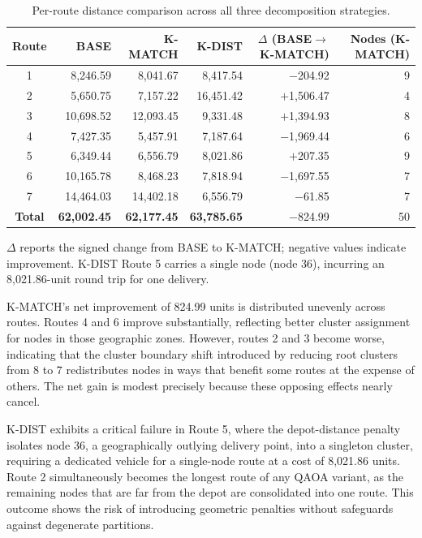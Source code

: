 \documentclass[a4paper]{report}
\begin{document}
{\begin{itemize}
\begin{itemize}
\begin{table}[h]
\centering
\begin{tabular}{crrrrr}
\hline
\textbf{Route} & \textbf{BASE} & \textbf{K-MATCH} & \textbf{K-DIST} 
& \textbf{$\Delta$ (BASE$\to$K-MATCH)} & \textbf{Nodes (K-MATCH)} \\
\hline
1 & 8,246.59  & 8,041.67  & 8,417.54  & $-$204.92   & 9  \\
2 & 5,650.75  & 7,157.22  & 16,451.42 & $+$1,506.47 & 4  \\
3 & 10,698.52 & 12,093.45 & 9,331.48  & $+$1,394.93 & 8  \\
4 & 7,427.35  & 5,457.91  & 7,187.64  & $-$1,969.44 & 6  \\
5 & 6,349.44  & 6,556.79  & 8,021.86  & $+$207.35   & 9  \\
6 & 10,165.78 & 8,468.23  & 7,818.94  & $-$1,697.55 & 7  \\
7 & 14,464.03 & 14,402.18 & 6,556.79  & $-$61.85    & 7  \\
\hline
\textbf{Total} & \textbf{62,002.45} & \textbf{62,177.45} 
               & \textbf{63,785.65} & $-$824.99 & 50 \\
\hline
\end{tabular}
\caption{Per-route distance comparison across all three decomposition strategies. }
\label{tab:exp3-perroute}
\end{table}

$\Delta$ reports the signed change from BASE to K-MATCH; negative values indicate 
improvement. K-DIST Route 5 carries a single node (node 36), incurring an 
8,021.86-unit round trip for one delivery.

K-MATCH's net improvement of 824.99 units is distributed unevenly across routes. Routes 4 and 6 improve substantially, reflecting better cluster assignment for nodes in those geographic zones. However, routes 2 and 3 become worse, indicating that the cluster boundary shift introduced by reducing root clusters from 8 to 7 redistributes nodes in ways that benefit some routes at the expense of others. 
The net gain is modest precisely because these opposing effects nearly cancel.

K-DIST exhibits a critical failure in Route 5, where the depot-distance penalty isolates node 36, a geographically outlying delivery point, into a singleton cluster, requiring a dedicated vehicle for a single-node route at a cost of 8,021.86 units. Route 2 simultaneously becomes the longest route of any QAOA variant, as the remaining nodes that are far from the depot are consolidated into one route. 
This outcome shows the risk of introducing geometric penalties without safeguards against degenerate partitions.


\end{itemize}
\end{itemize}}
\end{document}
